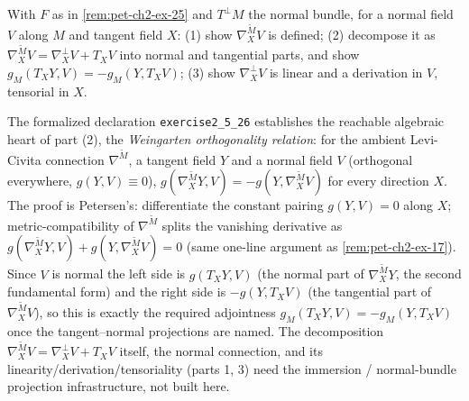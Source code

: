 \begin{remark}
  \label{rem:pet-ch2-ex-26}
  \leanok
  With $F$ as in \cref{rem:pet-ch2-ex-25} and $T^\perp M$ the normal bundle,
  for a normal field $V$ along $M$ and tangent field $X$: (1) show
  $\nabla^{\tilde M}_XV$ is defined; (2) decompose it as
  $\nabla^{\tilde M}_XV=\nabla^\perp_XV+T_XV$ into normal and tangential
  parts, and show $g_M(T_XY,V)=-g_M(Y,T_XV)$; (3) show $\nabla^\perp_XV$ is
  linear and a derivation in $V$, tensorial in $X$.

  The formalized declaration \texttt{exercise2\_5\_26} establishes the reachable
  algebraic heart of part (2), the \emph{Weingarten orthogonality relation}: for
  the ambient Levi-Civita connection $\nabla^{\tilde M}$, a tangent field $Y$ and
  a normal field $V$ (orthogonal everywhere, $g(Y,V)\equiv0$),
  $g(\nabla^{\tilde M}_XY,V)=-g(Y,\nabla^{\tilde M}_XV)$ for every direction $X$.
  The proof is Petersen's: differentiate the constant pairing $g(Y,V)=0$ along
  $X$; metric-compatibility of $\nabla^{\tilde M}$ splits the vanishing derivative
  as $g(\nabla^{\tilde M}_XY,V)+g(Y,\nabla^{\tilde M}_XV)=0$ (same one-line
  argument as \cref{rem:pet-ch2-ex-17}). Since $V$ is normal the left side is
  $g(T_XY,V)$ (the normal part of $\nabla^{\tilde M}_XY$, the second fundamental
  form) and the right side is $-g(Y,T_XV)$ (the tangential part of
  $\nabla^{\tilde M}_XV$), so this is exactly the required adjointness
  $g_M(T_XY,V)=-g_M(Y,T_XV)$ once the tangent–normal projections are named. The
  decomposition $\nabla^{\tilde M}_XV=\nabla^\perp_XV+T_XV$ itself, the normal
  connection, and its linearity/derivation/tensoriality (parts 1, 3) need the
  immersion / normal-bundle projection infrastructure, not built here.
\end{remark}


